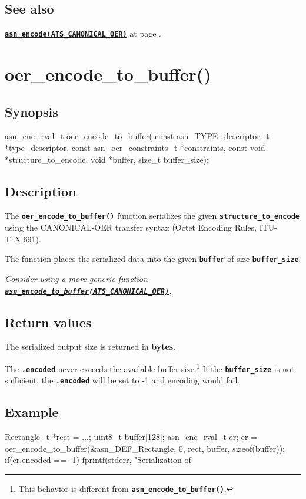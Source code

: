 \documentclass[english,oneside,12pt]{book}
\newcommand{\apisection}[2]{\clearpage\section{\label{#1}#2}}
\newcommand{\api}[2]{\hyperref[#1]{\code{#2}}}
\newcommand{\seealso}[2]{\api{#1}{#2} at page \pageref{#1}}
\newcommand{\code}[1]{\texttt{\textbf{\lstinline{#1}}}}
\begin{document}
\subsection*{See also}
\seealso{sec:asn_encode}{asn_encode(ATS_CANONICAL_OER)}.

\apisection{sec:oer_encode_to_buffer}{oer\_encode\_to\_buffer()}

\subsection*{Synopsis}

\begin{signature}
asn_enc_rval_t oer_encode_to_buffer(
    const asn_TYPE_descriptor_t *type_descriptor,
    const asn_oer_constraints_t *constraints,
    const void *structure_to_encode,
    void *buffer, size_t buffer_size);
\end{signature}

\subsection*{Description}

The \code{oer_encode_to_buffer()} function serializes the given \code{structure_to_encode} using the CANONICAL-OER transfer syntax (Octet Encoding Rules, ITU-T~X.691).

The function places the serialized data into the given
\code{buffer} of size \code{buffer_size}.\newline

\noindent\emph{Consider using a more generic function \api{sec:asn_encode_to_buffer}{asn_encode_to_buffer(ATS_CANONICAL_OER)}.}

\subsection*{Return values}


The serialized output size is returned in \textbf{bytes}.

The \code{.encoded} never exceeds the available buffer size.\footnote{This
behavior is different from \api{sec:asn_encode_to_buffer}{asn_encode_to_buffer()}.}
If the \code{buffer_size} is not sufficient, the \code{.encoded}
will be set to -1 and encoding would fail.

\subsection*{Example}
\begin{example}
Rectangle_t *rect = ...;
uint8_t buffer[128];
asn_enc_rval_t er;
er = oer_encode_to_buffer(&asn_DEF_Rectangle, 0, rect, buffer, sizeof(buffer));
if(er.encoded == -1) {
   fprintf(stderr, "Serialization of %
}
\end{example}
\end{document}
